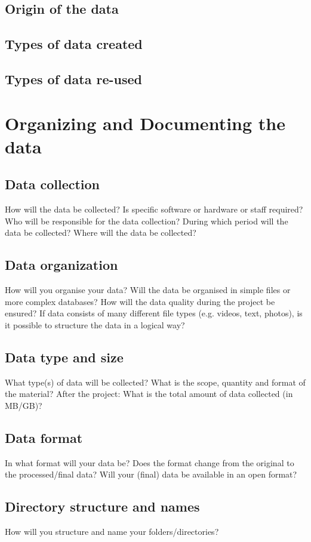 \documentclass[11pt,a4paper]{article}
\begin{document}
	\subsection{Origin of the data}
	
	\subsection{Types of data created}
	\subsection{Types of data re-used}
	
	\section{Organizing and Documenting the data}
	\subsection{Data collection}
	How will the data be collected?
	Is specific software or hardware or staff required?
	Who will be responsible for the data collection?
	During which period will the data be collected?
	Where will the data be collected?
	\subsection{Data organization}
	How will you organise your data?
	Will the data be organised in simple files or more complex databases?
	How will the data quality during the project be ensured?
	If data consists of many different file types (e.g. videos, text, photos), is it possible to structure the data in a logical way?
	\subsection{Data type and size}
	What type(s) of data will be collected?
	What is the scope, quantity and format of the material?
	After the project: What is the total amount of data collected (in MB/GB)?
	\subsection{Data format}
	In what format will your data be?
	Does the format change from the original to the processed/final data?
	Will your (final) data be available in an open format?
	\subsection{Directory structure and names}
	How will you structure and name your folders/directories?
\end{document}
